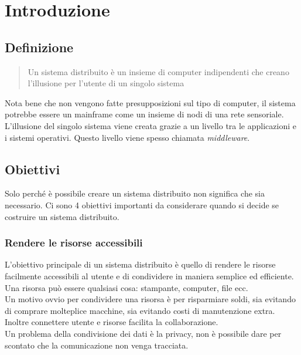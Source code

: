 \documentclass[12pt]{article}
\begin{document}
\tableofcontents
\newpage

\section{Introduzione}
\subsection{Definizione}
\begin{quote}
  Un sistema distribuito è un insieme di computer indipendenti che creano l'illusione per l'utente di un singolo sistema
\end{quote}
Nota bene che non vengono fatte presupposizioni sul tipo di computer, il sistema potrebbe essere un mainframe come un insieme di nodi di una rete sensoriale.\\
L'illusione del singolo sistema viene creata grazie a un livello tra le applicazioni e i sistemi operativi. Questo livello viene spesso chiamata \emph{middleware}. 

\subsection{Obiettivi}
Solo perché è possibile creare un sistema distribuito non significa che sia necessario. Ci sono 4 obiettivi importanti da considerare quando si decide se costruire un sistema distribuito.

\subsubsection{Rendere le risorse accessibili}
L'obiettivo principale di un sistema distribuito è quello di rendere le risorse facilmente accessibili al utente e di condividere in maniera semplice ed efficiente. Una risorsa può essere qualsiasi cosa: stampante, computer, file ecc. \\
Un motivo ovvio per condividere una risorsa è per risparmiare soldi, sia evitando di comprare molteplice macchine, sia evitando costi di manutenzione extra. \\ 
Inoltre connettere utente e risorse facilita la collaborazione. \\
Un problema della condivisione dei dati è la privacy, non è possibile dare per scontato che la comunicazione non venga tracciata.

\newpage
\end{document}
